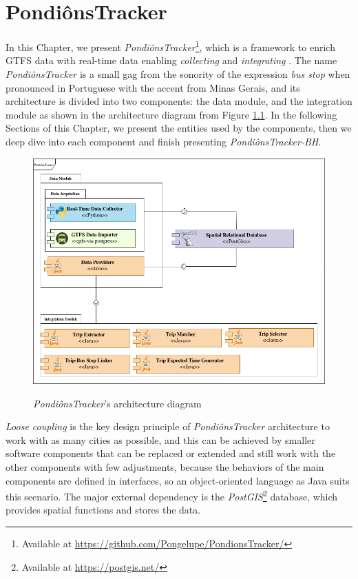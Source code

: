 
\chapter{PondiônsTracker}
\label{cap4}

\vspace{-1.9cm}

In this Chapter, we present \textit{PondiônsTracker}\footnote{Available at \url{https://github.com/Pongelupe/PondionsTracker/}}, 
which is a framework to enrich
GTFS data with real-time data enabling { \em collecting } and { \em integrating }. 
The name \textit{PondiônsTracker} is a small gag from the sonority of the expression{ \em bus stop}
when pronounced in Portuguese with the accent from Minas Gerais, and its architecture is divided into two components: 
the data module, and
the integration module 
as shown in the architecture diagram from Figure \ref{architecture:diagram}.
In the following Sections of this Chapter, we present the entities used by the components,
then we deep dive into each component and finish presenting \textit{PondiônsTracker-BH}.


\begin{figure}[h]
     \centering
        \caption{\textit{PondiônsTracker}'s architecture diagram}
        \includegraphics[width=.95\textwidth]{imagem/cap4/arq-pondionstracker.drawio.png}
        \label{architecture:diagram}
\end{figure}

{ \em Loose coupling} is the key design principle of \textit{PondiônsTracker} architecture to work with as many cities as possible, and this can be achieved by smaller software components that can be 
replaced or extended and still work with the other components with few adjustments, 
because the behaviors of the main components are defined in interfaces, so an object-oriented language as Java suits this scenario.
The major external dependency is the \textit{PostGIS}\footnote{Available at \url{https://postgis.net/}}
database, which provides spatial functions and stores the data.  


